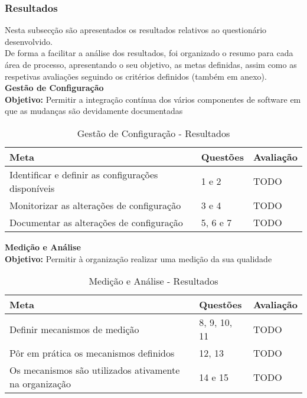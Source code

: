\documentclass[openany,10pt,a4paper]{article}
\begin{document}
\subsubsection{Resultados}
Nesta subsecção são apresentados os resultados relativos ao questionário desenvolvido. \\
De forma a facilitar a análise dos resultados, foi organizado o resumo para cada área de processo, apresentando o seu objetivo, as metas definidas, assim como as respetivas avaliações seguindo os critérios definidos (também em anexo). \\

\textbf{Gestão de Configuração} \\
\textbf{Objetivo:} Permitir a integração contínua dos vários componentes de software em que as mudanças são devidamente documentadas \\

\begin{table}[]
    \centering
    \caption{Gestão de Configuração - Resultados}
    \begin{tabular}{p{2in}|p{2in}|p{2in}}
        \hline	
		\textbf{Meta} & \textbf{Questões} & \textbf{Avaliação} \\ \hline
		Identificar e definir as configurações disponíveis & 1 e 2 & TODO \\ \hline
		Monitorizar as alterações de configuração  & 3 e 4 & TODO \\ \hline
		Documentar as alterações de configuração  & 5, 6 e 7 & TODO \\ \hline
    \end{tabular}
    \label{tab:analise-gestconfig}
\end{table}

\textbf{Medição e Análise}  \\
\textbf{Objetivo:} Permitir à organização realizar uma medição da sua qualidade

\begin{table}[]
    \centering
    \caption{Medição e Análise - Resultados}
    \begin{tabular}{p{2in}|p{2in}|p{2in}}
         \hline	
		\textbf{Meta} & \textbf{Questões} & \textbf{Avaliação} \\ \hline
		Definir mecanismos de medição & 8, 9, 10, 11 & TODO \\ \hline
		Pôr em prática os mecanismos definidos  & 12, 13 & TODO \\ \hline
		Os mecanismos são utilizados ativamente na organização & 14 e 15 & TODO \\ \hline
    \end{tabular}
    \label{tab:analise-medicaoanalise}
\end{table}
\end{document}

